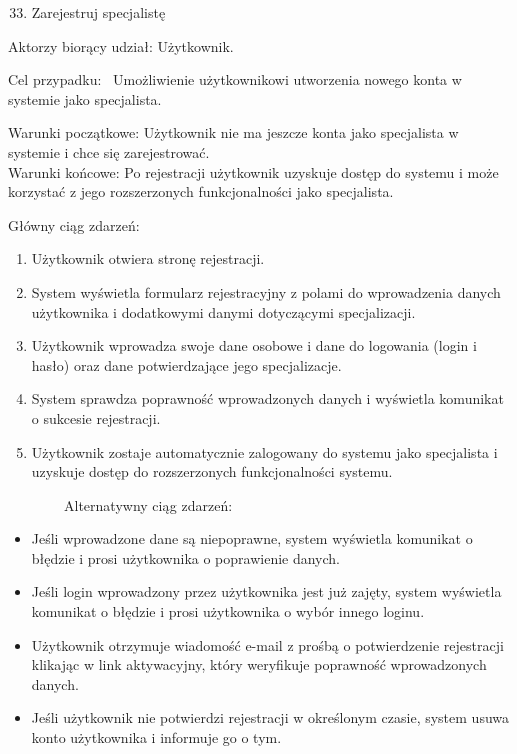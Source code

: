 \documentclass[
]{article}
\providecommand{\tightlist}{%
  \setlength{\itemsep}{0pt}\setlength{\parskip}{0pt}}
\begin{document}
{}

\begin{enumerate}
\setcounter{enumi}{32}
\tightlist
\item
  {Zarejestruj specjalistę}
\end{enumerate}

{Aktorzy biorący udział: Użytkownik.}

{Cel przypadku: ~Umożliwienie użytkownikowi utworzenia nowego konta w
systemie jako specjalista.}

{Warunki początkowe: Użytkownik nie ma jeszcze konta jako specjalista w
systemie i chce się zarejestrować.\\
Warunki końcowe: Po rejestracji użytkownik uzyskuje dostęp do systemu i
może korzystać z jego rozszerzonych funkcjonalności jako specjalista.}

{Główny ciąg zdarzeń:}

\begin{enumerate}
\tightlist
\item
  {Użytkownik otwiera stronę rejestracji.}
\item
  {System wyświetla formularz rejestracyjny z polami do wprowadzenia
  danych użytkownika i dodatkowymi danymi dotyczącymi specjalizacji.}
\item
  {Użytkownik wprowadza swoje dane osobowe i dane do logowania (login i
  hasło) oraz dane potwierdzające jego specjalizacje.}
\item
  {System sprawdza poprawność wprowadzonych danych i wyświetla komunikat
  o sukcesie rejestracji.}
\item
  {Użytkownik zostaje automatycznie zalogowany do systemu jako
  specjalista i uzyskuje dostęp do rozszerzonych funkcjonalności
  systemu.}
\end{enumerate}

{~~~~~~~~Alternatywny ciąg zdarzeń:}

\begin{itemize}
\tightlist
\item
  {Jeśli wprowadzone dane są niepoprawne, system wyświetla komunikat o
  błędzie i prosi użytkownika o poprawienie danych.}
\item
  {Jeśli login wprowadzony przez użytkownika jest już zajęty, system
  wyświetla komunikat o błędzie i prosi użytkownika o wybór innego
  loginu.}
\item
  {Użytkownik otrzymuje wiadomość e-mail z prośbą o potwierdzenie
  rejestracji klikając w link aktywacyjny, który weryfikuje poprawność
  wprowadzonych danych.}
\item
  {Jeśli użytkownik nie potwierdzi rejestracji w określonym czasie,
  system usuwa konto użytkownika i informuje go o tym.\\
  \strut \\
  }
\end{itemize}
\end{document}
